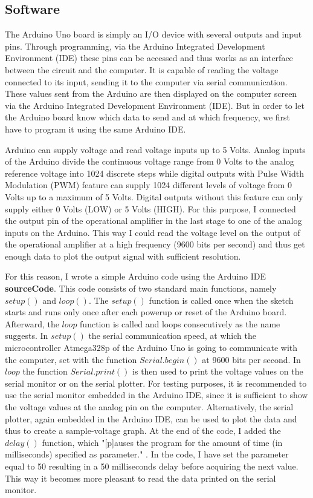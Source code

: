 \subsection{Software}
The Arduino Uno board is simply an I/O device with several outputs and input pins. Through programming, via the Arduino Integrated Development Environment (IDE) these pins can be accessed and thus works as an interface between the circuit and the computer. It is capable of reading the voltage connected to its input, sending it to the computer via serial communication. These values sent from the Arduino are then displayed on the computer screen via the Arduino Integrated Development Environment (IDE). But in order to let the Arduino board know which data to send and at which frequency, we first have to program it using the same Arduino IDE.\par
Arduino can supply voltage and read voltage inputs up to 5 Volts. Analog inputs of the Arduino divide the continuous voltage range from 0 Volts to the analog reference voltage into 1024 discrete steps while digital outputs with Pulse Width Modulation (PWM) feature can supply 1024 different levels of voltage from 0 Volts up to a maximum of 5 Volts. Digital outputs without this feature can only supply either 0 Volts (LOW) or 5 Volts (HIGH). For this purpose, I connected the output pin of the operational amplifier in the last stage to one of the analog inputs on the Arduino. This way I could read the voltage level on the output of the operational amplifier at a high frequency (9600 bits per second) and thus get enough data to plot the output signal with sufficient resolution. \par
For this reason, I wrote a simple Arduino code using the Arduino IDE \textbf{sourceCode}. This code consists of two standard main functions, namely $setup()$ and $loop()$. The $setup()$ function is called once when the sketch starts and runs only once after each powerup or reset of the Arduino board. Afterward, the $loop$ function is called and loops consecutively as the name suggests. In $setup()$ the serial communication speed, at which the microcontroller Atmega328p of the Arduino Uno is going to communicate with the computer, set with the function $Serial.begin()$ at 9600 bits per second. In $loop$ the function $Serial.print()$ is then used to print the voltage values on the serial monitor or on the serial plotter. For testing purposes, it is recommended to use the serial monitor embedded in the Arduino IDE, since it is sufficient to show the voltage values at the analog pin on the computer. Alternatively, the serial plotter, again embedded in the Arduino IDE, can be used to plot the data and thus to create a sample-voltage graph. At the end of the code, I added the $delay()$ function, which "[p]auses the program for the amount of time (in milliseconds) specified as parameter." \cite{delay}. In the code, I have set the parameter equal to 50 resulting in a 50 milliseconds delay before acquiring the next value. This way it becomes more pleasant to read the data printed on the serial monitor.

